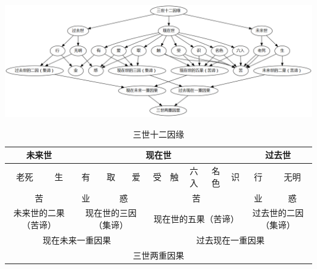 \includegraphics[scale=0.3]{释家/images/三世十二因缘.png}
\begin{table}[H]
  \centering
  \small
  \caption[]{三世十二因缘}
  \begin{tabular}{|c|c|c|c|c|c|c|c|c|c|c|c|}
    \hline \multicolumn{2}{|c}{未来世} & \multicolumn{8}{|c}{现在世} & \multicolumn{2}{|c|}{过去世} \\
    \hline 老死 & 生 & 有 & 取 & 爱 & 受 & 触 & 六入 & 名色 & 识 & 行 & 无明 \\
    \hline \multicolumn{2}{|c|}{苦} & 业 & \multicolumn{2}{c|}{惑} & \multicolumn{5}{c|}{苦} & 业 & 惑 \\
    \hline \multicolumn{2}{|c}{未来世的二果（苦谛）} & \multicolumn{3}{|c}{现在世的三因（集谛）} & \multicolumn{5}{|c}{现在世的五果（苦谛）} & \multicolumn{2}{|c|}{过去世的二因（集谛）} \\
    \hline \multicolumn{5}{|c|}{现在未来一重因果} & \multicolumn{7}{c|}{过去现在一重因果} \\
    \hline \multicolumn{12}{|c|}{三世两重因果} \\
    \hline
  \end{tabular}
\end{table}

